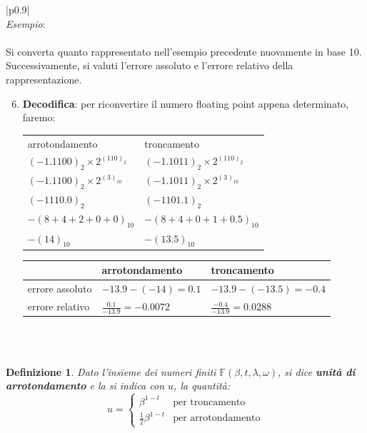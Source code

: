\documentclass{article}
\newtheorem*{definition}{\color{red}\textbf{Definizione}}
\numberwithin{equation}{section}
\newenvironment{example}
{\begin{center}
        \begin{tabular}{|p{0.9\textwidth}|}
            \hline \\ 
            \textit{Esempio}: \\\\ 
        }
        {
            \\\\ \hline
        \end{tabular}
    \end{center}
}
\begin{document}
\begin{example}
    Si converta quanto rappresentato nell'esempio precedente nuovamente in
    base 10. Successivamente, si valuti l'errore assoluto e l'errore relativo
    della rappresentazione.
    \begin{enumerate}
        \setcounter{enumi}{5}
        \item\textbf{Decodifica}: per riconvertire il numero floating point
            appena determinato, faremo:
            \begin{center}
                 \begin{tabular}{ll}
                     arrotondamento & troncamento \\ 
                     $(-1.1100)_2\times2^{(110)_2}$ & $(-1.1011)_2\times2^{(110)_2}$ \\ 
                     $(-1.1100)_2\times2^{(3)_{10}}$ & $(-1.1011)_2\times2^{(3)_{10}}$ \\ 
                     $(-1110.0)_2$ & $(-1101.1)_2$ \\ 
                     $-(8+4+2+0+0)_{10}$ & $-(8+4+0+1+0.5)_{10}$ \\ 
                     $-(14)_{10}$ & $-(13.5)_{10}$ \\ 
                 \end{tabular}
            \end{center}
            \begin{center}
                \begin{tabular}{l|l|l}
                    & arrotondamento & troncamento \\
                    \hline
                    errore assoluto & $-13.9 - (-14) = 0.1$ & $-13.9 - (-13.5) = -0.4$ \\
                    \hline
                    errore relativo & $\frac{0.1}{-13.9} = -0.0072$ & $\frac{-0.4}{-13.9} = 0.0288$
                \end{tabular} 
            \end{center}
   \end{enumerate} 
\end{example}
\begin{definition}
    Dato l'insieme dei numeri finiti $\mathbb{F}(\beta,t,\lambda,\omega)$, si
    dice \textbf{unità di arrotondamento} e la si indica con $u$, la quantità:
    $$u=\begin{cases}
        \beta^{1-t} & \text{per troncamento} \\ 
        \frac{1}{2}\beta^{1-t} & \text{per arrotondamento}
    \end{cases}$$
\end{definition}
\end{document}
